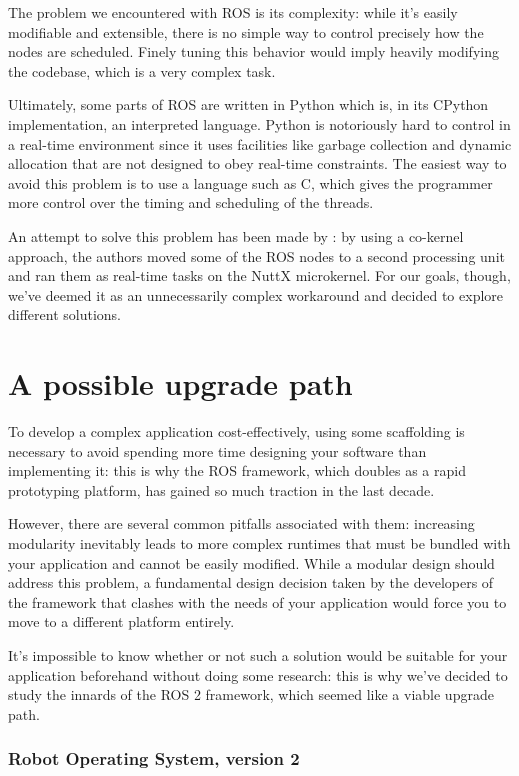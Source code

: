 \documentclass[a4paper,12pt]{report}
\begin{document}
The problem we encountered with ROS is its complexity: while it's easily modifiable and extensible, there is no simple way to control precisely how the nodes are scheduled. Finely tuning this behavior would imply heavily modifying the codebase, which is a very complex task.

Ultimately, some parts of ROS are written in Python \cite{roswiki-rospy} which is, in its CPython implementation, an interpreted language. Python is notoriously hard to control in a real-time environment since it uses facilities like garbage collection \cite{python-devguide-gc} and dynamic allocation that are not designed to obey real-time constraints. The easiest way to avoid this problem is to use a language such as C, which gives the programmer more control over the timing and scheduling of the threads.

An attempt to solve this problem has been made by \textcite{rt-ros-approach}: by using a co-kernel approach, the authors moved some of the ROS nodes to a second processing unit and ran them as real-time tasks on the NuttX microkernel. For our goals, though, we've deemed it as an unnecessarily complex workaround and decided to explore different solutions.

\section{A possible upgrade path}

To develop a complex application cost-effectively, using some scaffolding is necessary to avoid spending more time designing your software than implementing it: this is why the ROS framework, which doubles as a rapid prototyping platform, has gained so much traction in the last decade. 

However, there are several common pitfalls associated with them: increasing modularity inevitably leads to more complex runtimes that must be bundled with your application and cannot be easily modified. While a modular design should address this problem, a fundamental design decision taken by the developers of the framework that clashes with the needs of your application would force you to move to a different platform entirely.

It's impossible to know whether or not such a solution would be suitable for your application beforehand without doing some research: this is why we've decided to study the innards of the ROS 2 framework, which seemed like a viable upgrade path.

\subsubsection{Robot Operating System, version 2}
\end{document}
